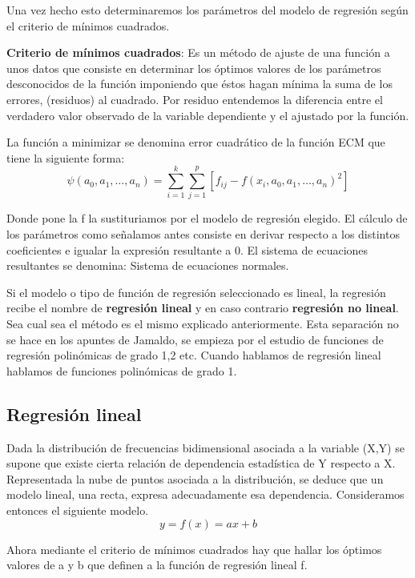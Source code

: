 \documentclass{article}
\theoremstyle{definition}
\begin{document}
	Una vez hecho esto determinaremos los parámetros del modelo de regresión según
	el criterio de mínimos cuadrados. \vspace{2mm}

	\textbf{Criterio de mínimos cuadrados}: Es un método de ajuste de una función
	a unos datos que consiste en determinar los óptimos valores de los parámetros
	desconocidos de la función imponiendo que éstos hagan mínima la suma de los
	errores, (residuos) al cuadrado. Por residuo entendemos la diferencia entre
	el verdadero valor observado de la variable dependiente y el ajustado por la
	función. \vspace{2mm}

	 La función a minimizar se denomina error cuadrático de la función ECM que
	 tiene la siguiente forma:
	 $$
	 \psi(a_0,a_1,\ldots,a_n) =
	 		\sum_{i=1}^k \sum_{j=1}^p [f_{ij} - f{(x_i,a_0,a_1,\ldots,a_n)}^2]
	 $$

	 Donde pone la f la sustituriamos por el modelo de regresión elegido. El
	 cálculo de los parámetros como señalamos antes consiste en derivar respecto a
	 los distintos coeficientes e igualar la expresión resultante a 0. El sistema
	 de ecuaciones resultantes se denomina: Sistema de ecuaciones normales.
	 \vspace{2mm}

	Si el modelo o tipo de función de regresión seleccionado es lineal, la
	regresión recibe el nombre de \textbf{regresión lineal} y en caso contrario
	\textbf{regresión no lineal}. Sea cual sea el método es el mismo explicado
	anteriormente. Esta separación no se hace en los apuntes de Jamaldo, se
	empieza por el estudio de funciones de regresión polinómicas de grado 1,2 etc.
	Cuando hablamos de regresión lineal hablamos de funciones polinómicas de grado
	1.

	\subsection{Regresión lineal}

	Dada la distribución de frecuencias bidimensional asociada a la variable (X,Y)
	se supone que existe cierta relación de dependencia estadística de Y respecto
	a X. Representada la nube de puntos asociada a la distribución, se deduce que
	un modelo lineal, una recta, expresa adecuadamente esa dependencia.
	Consideramos entonces el siguiente modelo. $$ y = f(x) = ax + b $$

	Ahora mediante el criterio de mínimos cuadrados hay que hallar los óptimos
	valores de a y b que definen a la función de regresión lineal f.
\end{document}
